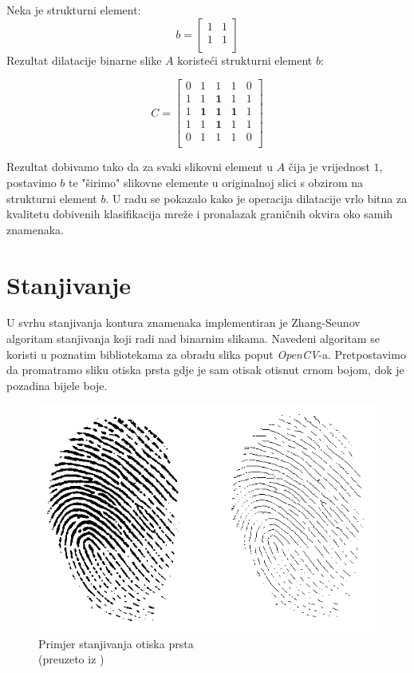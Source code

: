 \documentclass[times, utf8, diplomski]{fer}
\theoremstyle{definition}
\begin{document}
Neka je strukturni element:
\[
b=
\begin{bmatrix}
1 & 1\\
1 & 1\\
\end{bmatrix}
\]
Rezultat dilatacije binarne slike $A$ koristeći strukturni element $b$:

\[
C=
\begin{bmatrix}
0 & 1 & 1 & 1 & 0 \\
1 & 1 & \textbf{1} & 1 & 1 \\
1 & \textbf{1} & \textbf{1} & \textbf{1} & 1 \\
1 & 1 & \textbf{1} & 1 & 1 \\
0 & 1 & 1 & 1 & 0 \\

\end{bmatrix}
\]

Rezultat dobivamo tako da za svaki slikovni element u $A$ čija je vrijednost $1$, postavimo $b$ te "širimo" slikovne elemente u originalnoj slici s obzirom na strukturni element $b$. U radu se pokazalo kako je operacija dilatacije vrlo bitna za kvalitetu dobivenih klasifikacija mreže i pronalazak graničnih okvira oko samih znamenaka.

\section{Stanjivanje}
U svrhu stanjivanja kontura znamenaka implementiran je Zhang-Seunov algoritam stanjivanja koji radi nad binarnim slikama. Navedeni algoritam se koristi u poznatim bibliotekama za obradu slika poput \textit{OpenCV}-a. Pretpostavimo da promatramo sliku otiska prsta gdje je sam otisak otisnut crnom bojom, dok je pozadina bijele boje.

\begin{figure}[h]
\centering
\includegraphics[scale=0.46]{thinning.png}
\caption{Primjer stanjivanja otiska prsta  \\ (preuzeto iz \cite{ blog:xxx})}
\end{figure}
\end{document}
